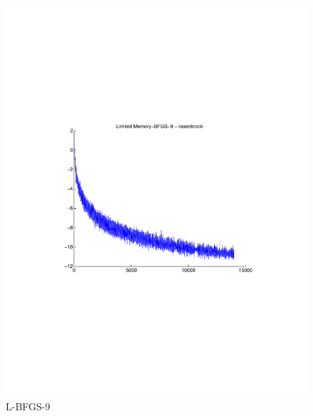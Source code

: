 \documentclass[12pt]{amsart}
\begin{document}
\begin{figure}[thpb]
\centering
\includegraphics[scale=0.60,clip=true,viewport=1in 3in 8in 8in]{images/rosenbrock-20/LBFGS9.pdf}
\caption{L-BFGS-9}
\label{fig:LBFGS9-rosen}
\end{figure}
\end{document}
